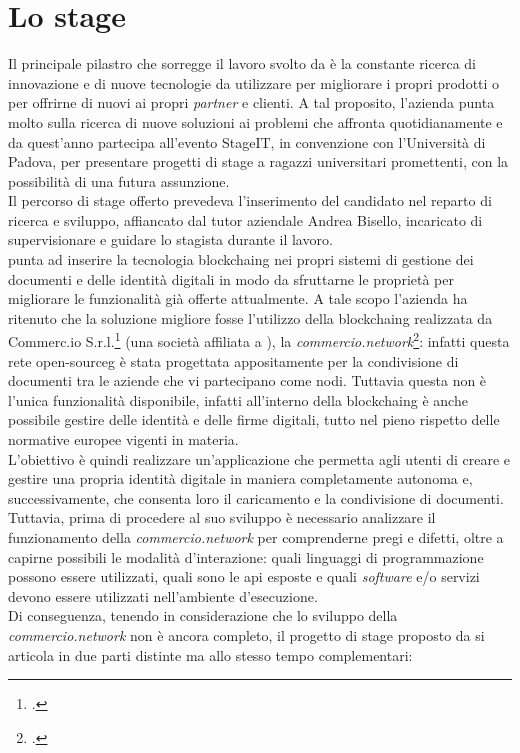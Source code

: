 \section{Lo stage}

Il principale pilastro che sorregge il lavoro svolto da \myCompany{} \companyTitle{} è la constante ricerca di innovazione e di nuove tecnologie da utilizzare per migliorare i propri prodotti o per offrirne di nuovi ai propri \textit{partner} e clienti. A tal proposito, l'azienda punta molto sulla ricerca di nuove soluzioni ai problemi che affronta quotidianamente e da quest'anno partecipa all'evento StageIT, in convenzione con l'Università di Padova, per presentare progetti di stage a ragazzi universitari promettenti, con la possibilità di una futura assunzione.\\
Il percorso di stage offerto prevedeva l'inserimento del candidato nel reparto di ricerca e sviluppo, affiancato dal tutor aziendale Andrea Bisello, incaricato di supervisionare e guidare lo stagista durante il lavoro.\\
\myCompany{} \companyTitle{} punta ad inserire la tecnologia \gls{blockchaing}\glsfirstoccur{} nei propri sistemi di gestione dei documenti e delle identità digitali in modo da sfruttarne le proprietà per migliorare le funzionalità già offerte attualmente. A tale scopo l'azienda ha ritenuto che la soluzione migliore fosse l'utilizzo della \gls{blockchaing} realizzata da Commerc.io S.r.l.\footcite{site:commerc-io} (una società affiliata a \myCompany{} \companyTitle), la \textit{commercio.network}\footcite{site:commercio-network}: infatti questa rete \gls{open-sourceg}\glsfirstoccur{} è stata progettata appositamente per la condivisione di documenti tra le aziende che vi partecipano come nodi. Tuttavia questa non è l'unica funzionalità disponibile, infatti all'interno della \gls{blockchaing} è anche possibile gestire delle identità e delle firme digitali, tutto nel pieno rispetto delle normative europee vigenti in materia.\\
L'obiettivo è quindi realizzare un'applicazione che permetta agli utenti di creare e gestire una propria identità digitale in maniera completamente autonoma e, successivamente, che consenta loro il caricamento e la condivisione di documenti. Tuttavia, prima di procedere al suo sviluppo è necessario analizzare il funzionamento della \textit{commercio.network} per comprenderne pregi e difetti, oltre a capirne possibili le modalità d'interazione: quali linguaggi di programmazione possono essere utilizzati, quali sono le \gls{api}\glsfirstoccur{} esposte e quali \textit{software} e/o servizi devono essere utilizzati nell'ambiente d'esecuzione.\\
Di conseguenza, tenendo in considerazione che lo sviluppo della \textit{commercio.network} non è ancora completo, il progetto di stage proposto da \myCompany{} \companyTitle{} si articola in due parti distinte ma allo stesso tempo complementari:

